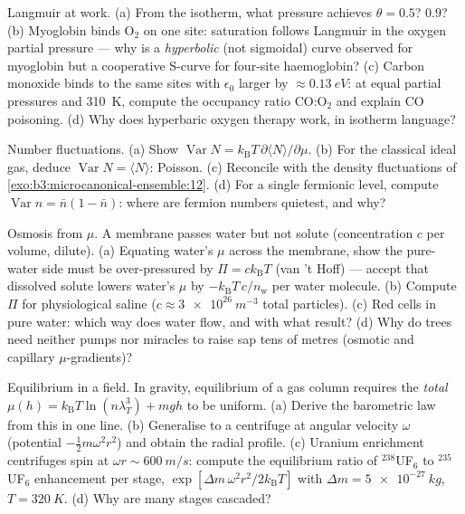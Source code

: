 \begin{exercise}[$\star\star$]\label{exo:b3:grand-canonical:6}
Langmuir at work. (a) From the isotherm, what pressure achieves
$\theta = 0.5$? $0.9$? (b) Myoglobin binds O$_2$ on one site:
saturation follows Langmuir in the oxygen partial pressure ---
why is a \emph{hyperbolic} (not sigmoidal) curve observed for
myoglobin but a cooperative S-curve for four-site haemoglobin?
(c) Carbon monoxide binds to the same sites with $\epsilon_0$
larger by $\approx\qty{0.13}{eV}$: at equal partial pressures and
\qty{310}{K}, compute the occupancy ratio CO:O$_2$ and explain CO
poisoning. (d) Why does hyperbaric oxygen therapy work, in
isotherm language?
\end{exercise}

\begin{exercise}[$\star\star$]\label{exo:b3:grand-canonical:7}
Number fluctuations. (a) Show $\operatorname{Var}N =
k_{\text{B}}T\,\partial\langle N\rangle/\partial\mu$. (b) For the
classical ideal gas, deduce $\operatorname{Var}N = \langle
N\rangle$: Poisson. (c) Reconcile with the density fluctuations of
\cref{exo:b3:microcanonical-ensemble:12}. (d) For a single
fermionic level, compute $\operatorname{Var}n = \bar n(1 - \bar
n)$: where are fermion numbers quietest, and why?
\end{exercise}

\begin{exercise}[$\star\star$]\label{exo:b3:grand-canonical:8}
Osmosis from $\mu$. A membrane passes water but not solute
(concentration $c$ per volume, dilute). (a) Equating water's $\mu$
across the membrane, show the pure-water side must be
over-pressured by $\Pi = ck_{\text{B}}T$ (van 't Hoff) --- accept
that dissolved solute lowers water's $\mu$ by
$-k_{\text{B}}T\,c/n_{\text{w}}$ per water molecule. (b) Compute
$\Pi$ for physiological saline ($c \approx \qty{3e26}{m^{-3}}$
total particles). (c) Red cells in pure water: which way does
water flow, and with what result? (d) Why do trees need neither
pumps nor miracles to raise sap tens of metres (osmotic and
capillary $\mu$-gradients)?
\end{exercise}

\begin{exercise}[$\star\star$]\label{exo:b3:grand-canonical:9}
Equilibrium in a field. In gravity, equilibrium of a gas column
requires the \emph{total}  $\mu(h) =
k_{\text{B}}T\ln(n\lambda_T^3) + mgh$ to be uniform. (a) Derive
the barometric law from this in one line. (b) Generalise to a
centrifuge at angular velocity $\omega$ (potential
$-\tfrac12 m\omega^2r^2$) and obtain the radial profile. (c)
Uranium enrichment centrifuges spin at $\omega r \sim
\qty{600}{m/s}$: compute the equilibrium ratio of $^{238}$UF$_6$
to $^{235}$UF$_6$ enhancement per stage, $\exp[\Delta m\,\omega^2
r^2/2k_{\text{B}}T]$ with $\Delta m = \qty{5e-27}{kg}$, $T =
\qty{320}{K}$. (d) Why are many stages cascaded?
\end{exercise}

